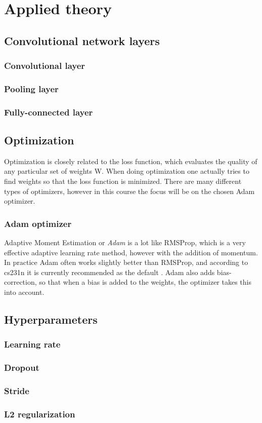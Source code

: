 \chapter{Applied theory}
\label{chp:theory}

\section{Convolutional network layers}


\subsection{Convolutional layer}

\subsection{Pooling layer}

\subsection{Fully-connected layer}


\section{Optimization}
Optimization is closely related to the loss function, which evaluates the quality of any particular set of weights W. When doing optimization one actually tries to find weights so that the loss function is minimized. There are many different types of optimizers, however in this course the focus will be on the chosen Adam optimizer. 

\subsection{Adam optimizer}
Adaptive Moment Estimation or \emph{Adam} is a lot like RMSProp, which is a very effective adaptive learning rate method, however with the addition of momentum. In practice Adam often works slightly better than RMSProp, and according to cs231n it is currently recommended as the default \citep{NN3}. Adam also adds bias-correction, so that when a bias is added to the weights, the optimizer takes this into account. 


\section{Hyperparameters}

\subsection{Learning rate}

\subsection{Dropout}

\subsection{Stride}

\subsection{L2 regularization}

